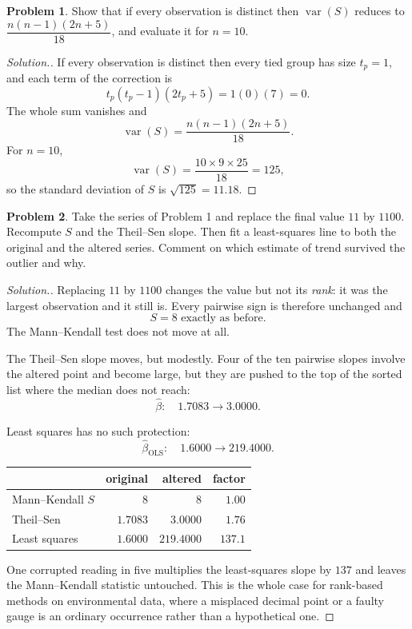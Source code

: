 \documentclass[11pt,a4paper]{article}
\theoremstyle{definition}
\newtheorem{problemx}{Problem}[section]
\newenvironment{problem}{\begin{problemx}}{\end{problemx}}
\newenvironment{solution}
  {\renewcommand{\qedsymbol}{}\begin{proof}[\textit{Solution}.]}
  {\end{proof}}
\begin{document}
\begin{problem}
Show that if every observation is distinct then $\operatorname{var}(S)$ reduces
to $\dfrac{n(n-1)(2n+5)}{18}$, and evaluate it for $n = 10$.
\end{problem}

\begin{solution}
If every observation is distinct then every tied group has size $t_p = 1$, and
each term of the correction is
$$t_p(t_p - 1)(2t_p + 5) = 1(0)(7) = 0 .$$
The whole sum vanishes and
$$\operatorname{var}(S) = \dfrac{n(n-1)(2n+5)}{18}.$$
For $n = 10$,
$$\operatorname{var}(S) = \dfrac{10 \times 9 \times 25}{18} = 125,$$
so the standard deviation of $S$ is $\sqrt{125} = 11.18$.
\end{solution}


\begin{problem}
Take the series of Problem 1 and replace the final value $11$ by $1100$.
Recompute $S$ and the Theil--Sen slope. Then fit a least-squares line to both the
original and the altered series. Comment on which estimate of trend survived the
outlier and why.
\end{problem}

\begin{solution}
Replacing $11$ by $1100$ changes the value but not its \emph{rank}: it was the
largest observation and it still is. Every pairwise sign is therefore unchanged
and
$$S = 8 \text{ exactly as before.}$$
The Mann--Kendall test does not move at all.

The Theil--Sen slope moves, but modestly. Four of the ten pairwise slopes involve
the altered point and become large, but they are pushed to the top of the sorted
list where the median does not reach:
$$\widehat{\beta}: \quad 1.7083 \longrightarrow 3.0000 .$$

Least squares has no such protection:
$$\widehat{\beta}_{\text{OLS}}: \quad 1.6000 \longrightarrow 219.4000 .$$

\begin{center}
\begin{tabular}{lrrr}
 & original & altered & factor\\\hline
Mann--Kendall $S$ & $8$ & $8$ & $1.00$\\
Theil--Sen & $1.7083$ & $3.0000$ & $1.76$\\
Least squares & $1.6000$ & $219.4000$ & $137.1$\\\hline
\end{tabular}
\end{center}

One corrupted reading in five multiplies the least-squares slope by $137$ and
leaves the Mann--Kendall statistic untouched. This is the whole case for
rank-based methods on environmental data, where a misplaced decimal point or a
faulty gauge is an ordinary occurrence rather than a hypothetical one.
\end{solution}
\end{document}
